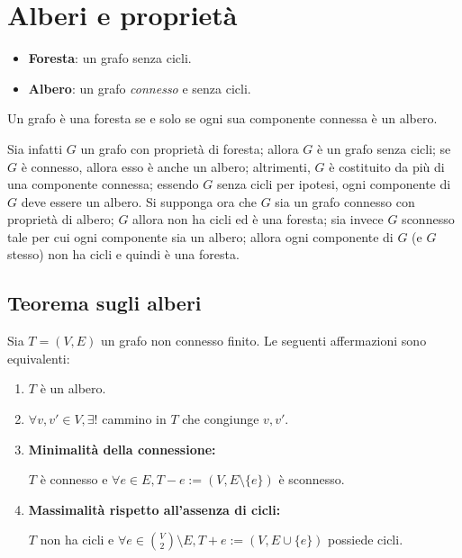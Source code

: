 \documentclass[oneside]{book}
\begin{document}

\section{Alberi e proprietà}

\begin{tcolorbox}[colback=yellow!30, colframe=yellow!30!black, title = {Alberi e Foreste}]
\begin{itemize}
    \item \textbf{Foresta}: un grafo senza cicli.
    \item \textbf{Albero}: un grafo \textit{connesso} e senza cicli.
\end{itemize}
\end{tcolorbox}

\begin{osservaz}
Un grafo è una foresta se e solo se ogni sua componente connessa è un albero.

Sia infatti $G$ un grafo con proprietà di foresta; allora $G$ è un grafo senza
cicli; se $G$ è connesso, allora esso è anche un albero; altrimenti, $G$ è
costituito da più di una componente connessa; essendo $G$ senza cicli per
ipotesi, ogni componente di $G$ deve essere un albero. Si supponga ora che
$G$ sia un grafo connesso con proprietà di albero; $G$ allora non ha cicli
ed è una foresta; sia invece $G$ sconnesso tale per cui ogni componente
sia un albero; allora ogni componente di $G$ (e $G$ stesso) non ha cicli
e quindi è una foresta.
\end{osservaz}

\subsection*{Teorema sugli alberi}
Sia $T=(V,E)$ un grafo non connesso finito. Le seguenti affermazioni
sono equivalenti:
\begin{enumerate}
\item $T$ è un albero.
\item $\forall v,v'\in V, \exists!$ cammino in $T$ che congiunge $v,v'$.
\item \textbf{Minimalità della connessione:}

$T$ è connesso e $\forall e\in E, T-e:=(V,E\setminus \{e\})$ è sconnesso.


\item \textbf{Massimalità rispetto all'assenza di cicli:}

$T$ non ha cicli e $\forall e \in \binom{V}{2}\setminus E, T+e:=(V,E\cup\{e\})$ possiede cicli.
\end{enumerate}
\end{document}
